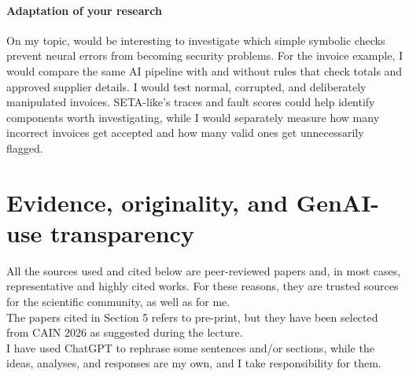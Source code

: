 \documentclass[11pt]{article}
\begin{document}
\paragraph{Adaptation of your research}

On my topic, would be interesting to investigate which simple symbolic checks prevent neural errors from becoming security problems. For the invoice example, I would compare the same AI pipeline with and without rules that check totals and approved supplier details. I would test normal, corrupted, and deliberately manipulated invoices. SETA-like's traces and fault scores could help identify components worth investigating, while I would separately measure how many incorrect invoices get accepted and how many valid ones get unnecessarily flagged.

\section{Evidence, originality, and GenAI-use transparency}
All the sources used and cited below are peer-reviewed papers and, in most cases, representative and highly cited works. For these reasons, they are trusted sources for the scientific community, as well as for me.\\
The papers cited in Section 5 refers to pre-print, but they have been selected from CAIN 2026 as suggested during the lecture.\\
I have used ChatGPT to rephrase some sentences and/or sections, while the ideas, analyses, and responses are my own, and I take responsibility for them.

\printbibliography
\end{document}
